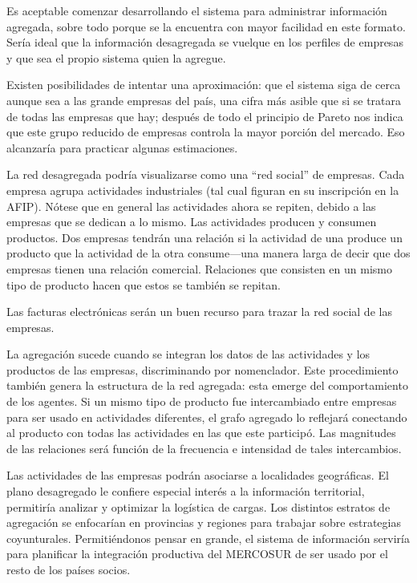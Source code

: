 \documentclass[a4paper]{report}
\begin{document}
Es aceptable comenzar desarrollando el sistema para administrar información agregada, sobre todo porque se la encuentra con mayor facilidad en este formato. Sería ideal que la información desagregada se vuelque en los perfiles de empresas y que sea el propio sistema quien la agregue.

Existen posibilidades de intentar una aproximación: que el sistema siga de cerca aunque sea a las grande empresas del país, una cifra más asible que si se tratara de todas las empresas que hay; después de todo el principio de Pareto nos indica que este grupo reducido de empresas controla la mayor porción del mercado. Eso alcanzaría para practicar algunas estimaciones.

La red desagregada podría visualizarse como una ``red social'' de empresas. Cada empresa agrupa actividades industriales (tal cual figuran en su inscripción en la AFIP). Nótese que en general las actividades ahora se repiten, debido a las empresas que se dedican a lo mismo. Las actividades producen y consumen productos. Dos empresas tendrán una relación si la actividad de una produce un producto que la actividad de la otra consume—una manera larga de decir que dos empresas tienen una relación comercial. Relaciones que consisten en un mismo tipo de producto hacen que estos se también se repitan.

Las facturas electrónicas serán un buen recurso para trazar la red social de las empresas.

La agregación sucede cuando se integran los datos de las actividades y los productos de las empresas, discriminando por nomenclador. Este procedimiento también genera la estructura de la red agregada: esta emerge del comportamiento de los agentes. Si un mismo tipo de producto fue intercambiado entre empresas para ser usado en actividades diferentes, el grafo agregado lo reflejará conectando al producto con todas las actividades en las que este participó. Las magnitudes de las relaciones será función de la frecuencia e intensidad de tales intercambios.

Las actividades de las empresas podrán asociarse a localidades geográficas. El plano desagregado le confiere especial interés a la información territorial, permitiría analizar y optimizar la logística de cargas. Los distintos estratos de agregación se enfocarían en provincias y regiones para trabajar sobre estrategias coyunturales. Permitiéndonos pensar en grande, el sistema de información serviría para planificar la integración productiva del MERCOSUR de ser usado por el resto de los países socios.
\end{document}
